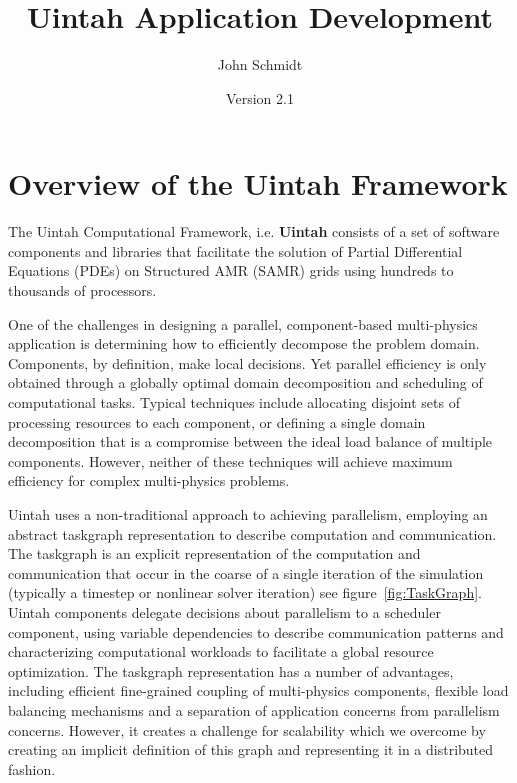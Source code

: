 \documentclass[12pt]{report}
\begin{document}
\title{Uintah Application Development}

\author{John Schmidt}

\date{Version 2.1}

\maketitle

\tableofcontents

\newpage


\chapter{Overview of the Uintah Framework}

The Uintah Computational Framework, i.e. \textbf{Uintah} consists of a
set of software components and libraries that facilitate the solution
of Partial Differential Equations (PDEs) on Structured AMR (SAMR)
grids using hundreds to thousands of processors.

One of the challenges in designing a parallel, component-based
multi-physics application is determining how to efficiently decompose
the problem domain. Components, by definition, make local
decisions. Yet parallel efficiency is only obtained through a globally
optimal domain decomposition and scheduling of computational
tasks. Typical techniques include allocating disjoint sets of
processing resources to each component, or defining a single domain
decomposition that is a compromise between the ideal load balance of
multiple components. However, neither of these techniques will achieve
maximum efficiency for complex multi-physics problems.

Uintah uses a non-traditional approach to achieving parallelism,
employing an abstract taskgraph representation to describe computation
and communication. The taskgraph is an explicit representation of the
computation and communication that occur in the coarse of a single
iteration of the simulation (typically a timestep or nonlinear solver
iteration) see figure~\ref{fig:TaskGraph}. Uintah components delegate
decisions about parallelism to a scheduler component, using variable
dependencies to describe communication patterns and characterizing
computational workloads to facilitate a global resource
optimization. The taskgraph representation has a number of advantages,
including efficient fine-grained coupling of multi-physics components,
flexible load balancing mechanisms and a separation of application
concerns from parallelism concerns. However, it creates a challenge
for scalability which we overcome by creating an implicit definition
of this graph and representing it in a distributed fashion.
\end{document}
